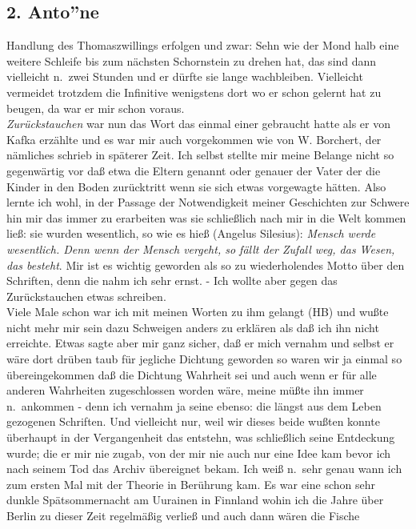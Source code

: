 \documentclass[
]{article}
\author{}
\date{\vspace{-2.5em}}
\begin{document}
\subsection{2. Anto''ne}\label{antone}

Handlung des Thomaszwillings erfolgen und zwar: Sehn wie der Mond halb
eine weitere Schleife bis zum nächsten Schornstein zu drehen hat, das
sind dann vielleicht n.~zwei Stunden und er dürfte sie lange
wachbleiben. Vielleicht vermeidet trotzdem die Infinitive wenigstens
dort wo er schon gelernt hat zu beugen, da war er mir schon voraus.\\
\emph{Zurückstauchen} war nun das Wort das einmal einer gebraucht hatte
als er von Kafka erzählte und es war mir auch vorgekommen wie von W.
Borchert, der nämliches schrieb in späterer Zeit. Ich selbst stellte mir
meine Belange nicht so gegenwärtig vor daß etwa die Eltern genannt oder
genauer der Vater der die Kinder in den Boden zurücktritt wenn sie sich
etwas vorgewagte hätten. Also lernte ich wohl, in der Passage der
Notwendigkeit meiner Geschichten zur Schwere hin mir das immer zu
erarbeiten was sie schließlich nach mir in die Welt kommen ließ: sie
wurden wesentlich, so wie es hieß (Angelus Silesius): \emph{Mensch werde
wesentlich. Denn wenn der Mensch vergeht, so fällt der Zufall weg, das
Wesen, das besteht}. Mir ist es wichtig geworden als so zu
wiederholendes Motto über den Schriften, denn die nahm ich sehr ernst. -
Ich wollte aber gegen das Zurückstauchen etwas schreiben.\\
Viele Male schon war ich mit meinen Worten zu ihm gelangt (HB) und wußte
nicht mehr mir sein dazu Schweigen anders zu erklären als daß ich ihn
nicht erreichte. Etwas sagte aber mir ganz sicher, daß er mich vernahm
und selbst er wäre dort drüben taub für jegliche Dichtung geworden so
waren wir ja einmal so übereingekommen daß die Dichtung Wahrheit sei und
auch wenn er für alle anderen Wahrheiten zugeschlossen worden wäre,
meine müßte ihn immer n.~ankommen - denn ich vernahm ja seine ebenso:
die längst aus dem Leben gezogenen Schriften. Und vielleicht nur, weil
wir dieses beide wußten konnte überhaupt in der Vergangenheit das
entstehn, was schließlich seine Entdeckung wurde; die er mir nie zugab,
von der mir nie auch nur eine Idee kam bevor ich nach seinem Tod das
Archiv übereignet bekam. Ich weiß n.~sehr genau wann ich zum ersten Mal
mit der Theorie in Berührung kam. Es war eine schon sehr dunkle
Spätsommernacht am Uurainen in Finnland wohin ich die Jahre über Berlin
zu dieser Zeit regelmäßig verließ und auch dann wären die Fische
\end{document}
